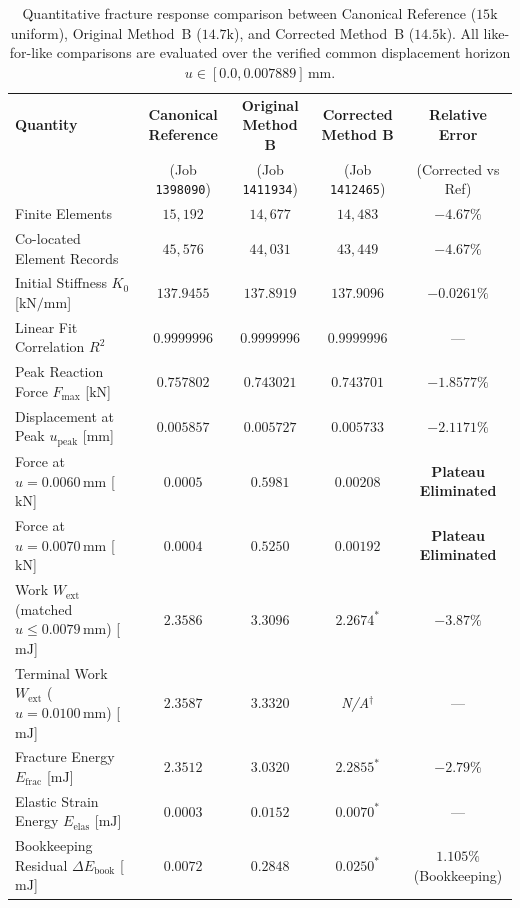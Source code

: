 \begin{table}[htbp]
\centering
\caption{Quantitative fracture response comparison between Canonical Reference ($15\mathrm{k}$ uniform), Original Method~B ($14.7\mathrm{k}$), and Corrected Method~B ($14.5\mathrm{k}$). All like-for-like comparisons are evaluated over the verified common displacement horizon $u \in [0.0, 0.007889]\,\mathrm{mm}$.}
\label{tab:method_b_corrected_comparison}
\small
\begin{tabular}{lcccc}
\hline
\textbf{Quantity} & \textbf{Canonical Reference} & \textbf{Original Method B} & \textbf{Corrected Method B} & \textbf{Relative Error} \\
 & (Job \texttt{1398090}) & (Job \texttt{1411934}) & (Job \texttt{1412465}) & (Corrected vs Ref) \\
\hline
Finite Elements & $15{,}192$ & $14{,}677$ & $14{,}483$ & $-4.67\%$ \\
Co-located Element Records & $45{,}576$ & $44{,}031$ & $43{,}449$ & $-4.67\%$ \\
Initial Stiffness $K_0$ [$\mathrm{kN/mm}$] & $137.9455$ & $137.8919$ & $137.9096$ & $-0.0261\%$ \\
Linear Fit Correlation $R^2$ & $0.9999996$ & $0.9999996$ & $0.9999996$ & --- \\
Peak Reaction Force $F_{\max}$ [$\mathrm{kN}$] & $0.757802$ & $0.743021$ & $0.743701$ & $-1.8577\%$ \\
Displacement at Peak $u_{\mathrm{peak}}$ [$\mathrm{mm}$] & $0.005857$ & $0.005727$ & $0.005733$ & $-2.1171\%$ \\
Force at $u = 0.0060\,\mathrm{mm}$ [$\mathrm{kN}$] & $0.0005$ & $0.5981$ & $\mathbf{0.00208}$ & \textbf{Plateau Eliminated} \\
Force at $u = 0.0070\,\mathrm{mm}$ [$\mathrm{kN}$] & $0.0004$ & $0.5250$ & $\mathbf{0.00192}$ & \textbf{Plateau Eliminated} \\
Work $W_{\mathrm{ext}}$ (matched $u \le 0.0079\,\mathrm{mm}$) [$\mathrm{mJ}$] & $2.3586$ & $3.3096$ & $\mathbf{2.2674}^*$ & $-3.87\%$ \\
Terminal Work $W_{\mathrm{ext}}$ ($u = 0.0100\,\mathrm{mm}$) [$\mathrm{mJ}$] & $2.3587$ & $3.3320$ & \emph{N/A}$^\dagger$ & --- \\
Fracture Energy $E_{\mathrm{frac}}$ [$\mathrm{mJ}$] & $2.3512$ & $3.0320$ & $2.2855^*$ & $-2.79\%$ \\
Elastic Strain Energy $E_{\mathrm{elas}}$ [$\mathrm{mJ}$] & $0.0003$ & $0.0152$ & $0.0070^*$ & --- \\
Bookkeeping Residual $\Delta E_{\mathrm{book}}$ [$\mathrm{mJ}$] & $0.0072$ & $0.2848$ & $0.0250^*$ & $1.105\%$ (Bookkeeping) \\

\end{tabular}
\end{table}
